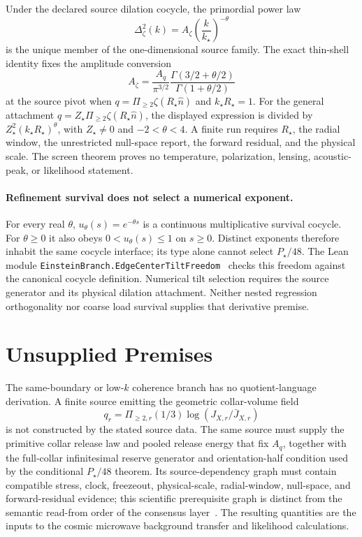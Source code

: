 \documentclass[11pt]{article}
\theoremstyle{remark}
\theoremstyle{plain}
\begin{document}
Under the declared source dilation cocycle, the primordial power law
\[
  \Delta_\zeta^2(k)=A_\zeta\left(\frac{k}{k_\star}\right)^{-\theta}
\]
is the unique member of the one-dimensional source family. The exact thin-shell identity fixes
the amplitude conversion
\[
A_\zeta=\frac{A_q}{\pi^{3/2}}
\frac{\Gamma(3/2+\theta/2)}{\Gamma(1+\theta/2)}
\]
at the source pivot when \(q=\Pi_{\geq2}\zeta(R_\star\hat n)\) and
\(k_\star R_\star=1\). For the general attachment
\(q=Z_\star\Pi_{\geq2}\zeta(R_\star\hat n)\), the displayed expression
is divided by \(Z_\star^2(k_\star R_\star)^\theta\), with
\(Z_\star\neq0\) and \(-2<\theta<4\).
A finite run requires \(R_\star\), the radial window, the unrestricted
null-space report, the forward residual, and the physical scale. The screen theorem proves no
temperature, polarization, lensing, acoustic-peak, or likelihood statement.



\paragraph{Refinement survival does not select a numerical exponent.}
For every real \(\theta\), \(u_\theta(s)=e^{-\theta s}\) is a
continuous multiplicative survival cocycle. For \(\theta\ge0\) it also
obeys \(0<u_\theta(s)\le1\) on \(s\ge0\). Distinct exponents
therefore inhabit the same cocycle interface; its type alone cannot select
\(P_\star/48\). The Lean module
\texttt{EinsteinBranch.EdgeCenterTiltFreedom}~\cite{ophlean}
checks this freedom against the canonical cocycle definition. Numerical
tilt selection requires the source generator and its physical
dilation attachment. Neither nested regression orthogonality nor coarse
load survival supplies that derivative premise.

\section{Unsupplied Premises}
\label{sec:unsupplied}

The same-boundary or low-\(k\) coherence branch has no quotient-language
derivation. A finite source emitting the geometric collar-volume field
\[
q_r=\Pi_{\ge2,r}(1/3)\log(J_{X,r}/\bar J_{X,r})
\]
is not constructed by the stated source data. The same source must supply the primitive collar release
law and pooled release energy that fix \(A_q\), together with the full-collar
infinitesimal reserve generator and orientation-half condition used by the
conditional \(P_\star/48\) theorem. Its source-dependency graph must contain
compatible stress, clock, freezeout, physical-scale, radial-window, null-space,
and forward-residual evidence; this scientific prerequisite graph is
distinct from the semantic read-from order of the consensus
layer~\cite{ophcmb}. The resulting quantities are the inputs to the cosmic
microwave background transfer and likelihood calculations.
\end{document}
